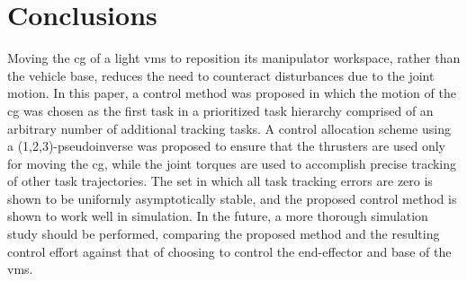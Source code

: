 \documentclass[../main.tex]{subfiles}
\begin{document}
\section{Conclusions}\label{sec:conclusion}\vspace{-11pt}
Moving the \gls{cg} of a light \gls{vms} to reposition its manipulator workspace, rather than the vehicle base, reduces the need to counteract disturbances due to the joint motion. In this paper, a control method was proposed in which the motion of the \gls{cg} was chosen as the first task in a prioritized task hierarchy comprised of an arbitrary number of additional tracking tasks. A control allocation scheme using a (1,2,3)-pseudoinverse was  proposed to ensure that the thrusters are used only for moving the \gls{cg}, while the joint torques are used to accomplish precise tracking of other task trajectories.
The set in which all task tracking errors are zero is shown to be uniformly asymptotically stable, and the proposed control method is shown to work well in simulation. 
%
In the future, a more thorough simulation study should be performed, comparing the proposed method and the resulting control effort against that of choosing to control the end-effector and base of the \gls{vms}.%
%
\end{document}
